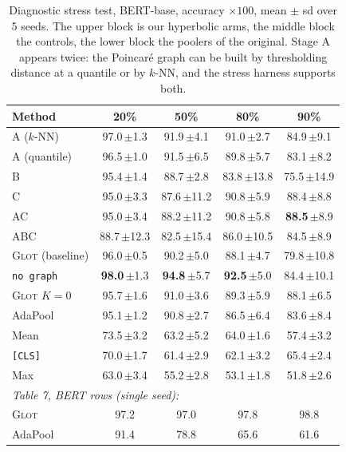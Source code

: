\documentclass{article}
\begin{document}
\begin{table}[h]
\caption{Diagnostic stress test, BERT-base, accuracy $\times100$, mean $\pm$ sd
over $5$ seeds. The upper block is our hyperbolic arms, the middle block the
controls, the lower block the poolers of the original. Stage A appears twice:
the Poincar\'e graph can be built by thresholding distance at a quantile or by
$k$-NN, and the stress harness supports both.}
\label{tab:stress}
\begin{center}
\small
\begin{tabular}{lcccc}
\toprule
Method & 20\% & 50\% & 80\% & 90\% \\
\midrule
A ($k$-NN)          & 97.0\,$\pm$1.3 & 91.9\,$\pm$4.1 & 91.0\,$\pm$2.7 & 84.9\,$\pm$9.1 \\
A (quantile)        & 96.5\,$\pm$1.0 & 91.5\,$\pm$6.5 & 89.8\,$\pm$5.7 & 83.1\,$\pm$8.2 \\
B                   & 95.4\,$\pm$1.4 & 88.7\,$\pm$2.8 & 83.8\,$\pm$13.8 & 75.5\,$\pm$14.9 \\
C                   & 95.0\,$\pm$3.3 & 87.6\,$\pm$11.2 & 90.8\,$\pm$5.9 & 88.4\,$\pm$8.8 \\
AC                  & 95.0\,$\pm$3.4 & 88.2\,$\pm$11.2 & 90.8\,$\pm$5.8 & \textbf{88.5}\,$\pm$8.9 \\
ABC                 & 88.7\,$\pm$12.3 & 82.5\,$\pm$15.4 & 86.0\,$\pm$10.5 & 84.5\,$\pm$8.9 \\
\midrule
\textsc{Glot} (baseline) & 96.0\,$\pm$0.5 & 90.2\,$\pm$5.0 & 88.1\,$\pm$4.7 & 79.8\,$\pm$10.8 \\
\texttt{no graph}   & \textbf{98.0}\,$\pm$1.3 & \textbf{94.8}\,$\pm$5.7 & \textbf{92.5}\,$\pm$5.0 & 84.4\,$\pm$10.1 \\
\textsc{Glot} $K{=}0$ & 95.7\,$\pm$1.6 & 91.0\,$\pm$3.6 & 89.3\,$\pm$5.9 & 88.1\,$\pm$6.5 \\
\midrule
AdaPool             & 95.1\,$\pm$1.2 & 90.8\,$\pm$2.7 & 86.5\,$\pm$6.4 & 83.6\,$\pm$8.4 \\
Mean                & 73.5\,$\pm$3.2 & 63.2\,$\pm$5.2 & 64.0\,$\pm$1.6 & 57.4\,$\pm$3.2 \\
\texttt{[CLS]}      & 70.0\,$\pm$1.7 & 61.4\,$\pm$2.9 & 62.1\,$\pm$3.2 & 65.4\,$\pm$2.4 \\
Max                 & 63.0\,$\pm$3.4 & 55.2\,$\pm$2.8 & 53.1\,$\pm$1.8 & 51.8\,$\pm$2.6 \\
\midrule
\multicolumn{5}{l}{\emph{\citet{mantri2026glot} Table 7, BERT rows (single seed):}} \\
\textsc{Glot}       & 97.2 & 97.0 & 97.8 & 98.8 \\
AdaPool             & 91.4 & 78.8 & 65.6 & 61.6 \\
\bottomrule
\end{tabular}
\end{center}
\end{table}
\end{document}
